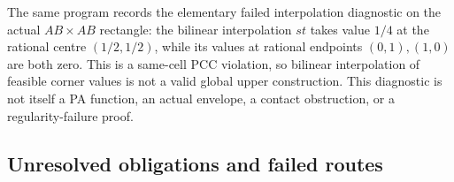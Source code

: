 \documentclass[
  10pt,
]{article}
\begin{document}
The same program records the elementary failed interpolation diagnostic
on the actual \(AB\times AB\) rectangle: the bilinear interpolation
\(s t\) takes value \(1/4\) at the rational centre \((1/2,1/2)\), while
its values at rational endpoints \((0,1),(1,0)\) are both zero. This is
a same-cell PCC violation, so bilinear interpolation of feasible corner
values is not a valid global upper construction. This diagnostic is not
itself a PA function, an actual envelope, a contact obstruction, or a
regularity-failure proof.

\subsection{Unresolved obligations and failed
routes}\label{unresolved-obligations-and-failed-routes}
\end{document}
